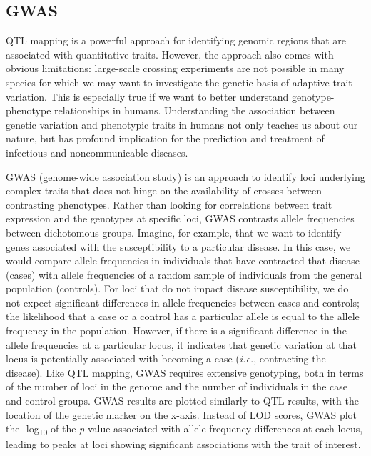 \documentclass[
]{book}
\begin{document}
\hypertarget{gwas}{%
\subsection{GWAS}\label{gwas}}

QTL mapping is a powerful approach for identifying genomic regions that are associated with quantitative traits. However, the approach also comes with obvious limitations: large-scale crossing experiments are not possible in many species for which we may want to investigate the genetic basis of adaptive trait variation. This is especially true if we want to better understand genotype-phenotype relationships in humans. Understanding the association between genetic variation and phenotypic traits in humans not only teaches us about our nature, but has profound implication for the prediction and treatment of infectious and noncommunicable diseases.

GWAS (genome-wide association study) is an approach to identify loci underlying complex traits that does not hinge on the availability of crosses between contrasting phenotypes. Rather than looking for correlations between trait expression and the genotypes at specific loci, GWAS contrasts allele frequencies between dichotomous groups. Imagine, for example, that we want to identify genes associated with the susceptibility to a particular disease. In this case, we would compare allele frequencies in individuals that have contracted that disease (cases) with allele frequencies of a random sample of individuals from the general population (controls). For loci that do not impact disease susceptibility, we do not expect significant differences in allele frequencies between cases and controls; the likelihood that a case or a control has a particular allele is equal to the allele frequency in the population. However, if there is a significant difference in the allele frequencies at a particular locus, it indicates that genetic variation at that locus is potentially associated with becoming a case (\emph{i.e.}, contracting the disease). Like QTL mapping, GWAS requires extensive genotyping, both in terms of the number of loci in the genome and the number of individuals in the case and control groups. GWAS results are plotted similarly to QTL results, with the location of the genetic marker on the x-axis. Instead of LOD scores, GWAS plot the -log\textsubscript{10} of the \emph{p}-value associated with allele frequency differences at each locus, leading to peaks at loci showing significant associations with the trait of interest.
\end{document}
